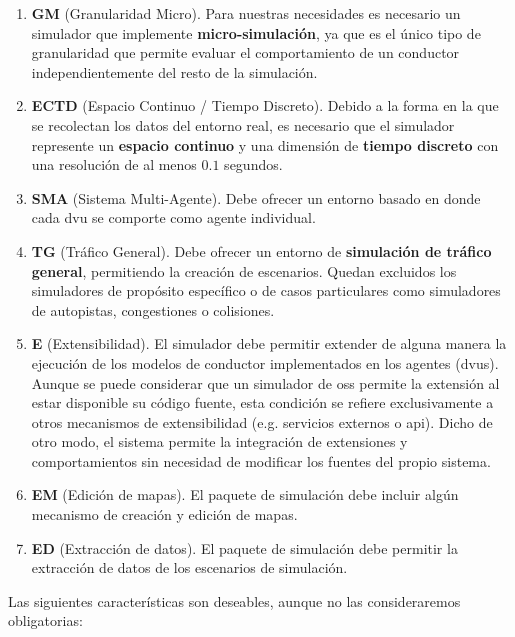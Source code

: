 \begin{enumerate}
	\item \textbf{GM} (Granularidad Micro). Para nuestras necesidades es necesario un simulador que implemente \textbf{micro-simulación}, ya que es el único tipo de granularidad que permite evaluar el comportamiento de un conductor independientemente del resto de la simulación.
	\item \textbf{ECTD} (Espacio Continuo / Tiempo Discreto). Debido a la forma en la que se recolectan los datos del entorno real, es necesario que el simulador represente un \textbf{espacio continuo} y una dimensión de \textbf{tiempo discreto} con una resolución de al menos $0.1$ segundos.
	\item \textbf{SMA} (Sistema Multi-Agente). Debe ofrecer un entorno basado en \textbf{} donde cada \gls{dvu} se comporte como agente individual.
	\item \textbf{TG} (Tráfico General). Debe ofrecer un entorno de \textbf{simulación de tráfico general}, permitiendo la creación de escenarios. Quedan excluidos los simuladores de propósito específico o de casos particulares como simuladores de autopistas, congestiones o colisiones.
	\item \textbf{E} (Extensibilidad). El simulador debe permitir extender de alguna manera la ejecución de los modelos de conductor implementados en los agentes (\glspl{dvu}). Aunque se puede considerar que un simulador de \gls{oss} permite la extensión al estar disponible su código fuente, esta condición se refiere exclusivamente a otros mecanismos de extensibilidad (e.g. servicios externos o \acrshort{api}). Dicho de otro modo, el sistema permite la integración de extensiones y comportamientos sin necesidad de modificar los fuentes del propio sistema.
	\item \textbf{EM} (Edición de mapas). El paquete de simulación debe incluir algún mecanismo de creación y edición de mapas.
	\item \textbf{ED} (Extracción de datos). El paquete de simulación debe permitir la extracción de datos de los escenarios de simulación.
\end{enumerate}

Las siguientes características son deseables, aunque no las consideraremos obligatorias:


